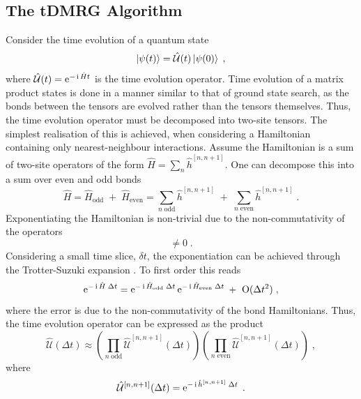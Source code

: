 \subsection{The tDMRG Algorithm}
Consider the time evolution of a quantum state
\begin{equation}
	\ket{\psi (t)} = \hat{\mathcal{U}}(t) \ket{\psi (0)} \; ,
\end{equation}
where $\hat{\mathcal{U}}(t) = \operatorname{e}^{ - \operatorname{i} \hat{H} t }$ is the time evolution operator. 
Time evolution of a matrix product states is done in a manner similar to that of ground state search, as the bonds between the tensors are evolved rather than the tensors themselves. Thus, the time evolution operator must be decomposed into two-site tensors. The simplest realisation of this is achieved, when considering a Hamiltonian containing only nearest-neighbour interactions.
Assume the Hamiltonian is a sum of two-site operators of the form $\hat{H} = \sum_{n} \hat{h}^{[n , n+1]}$. One can decompose this into a sum over even and odd bonds
\begin{equation}
	\hat{H} = \hat{H}_{\mathrm{odd}} \; + \; \hat{H}_{\mathrm{even}} = \sum_{n \; \mathrm{odd}} \hat{h}^{[n , n+1]} \; + \; \sum_{n \; \mathrm{even}} \hat{h}^{[n , n+1]} \; .
\end{equation}  
Exponentiating the Hamiltonian is non-trivial due to the non-commutativity of the operators
\begin{equation}
	[ \hat{h}_{\mathrm{odd}}^{[n , n+1]} \; , \; \hat{h}_{\mathrm{even}}^{[n , n+1]} ] \neq 0 \; .
\end{equation}
Considering a small time slice, $\delta t$, the exponentiation can be achieved through the Trotter-Suzuki expansion \cite{Suzuki}. To first order this reads
\begin{equation}
	\operatorname{e}^{- \operatorname{i} \hat{H} \; \Delta t} = \operatorname{e}^{- \operatorname{i} \hat{H}_{\mathrm{odd}} \; \Delta t } \operatorname{e}^{- \operatorname{i} \hat{H}_{\mathrm{even}} \; \Delta t} \; + \; \;  \mathrm{O}(\Delta t^2) \; ,
\end{equation}
where the error is due to the non-commutativity of the bond Hamiltonians. Thus, the time evolution operator can be expressed as the product
\begin{equation}
	\hat{\mathcal{U}}(\Delta t) \approx \left( \prod_{n \; \mathrm{odd}} \hat{\mathcal{U}}^{[n,n+1]} (\Delta t) \right) \left( \prod_{n \; \mathrm{even}} \hat{\mathcal{U}}^{[n,n+1]} (\Delta t) \right) \; ,
\end{equation}
where
\begin{equation}
	\hat{\mathcal{U}}^{[n,n+1]} (\Delta t) = \operatorname{e}^{- \operatorname{i} \hat{h}^{[n , n+1]} \; \Delta t } \; .
\end{equation}
